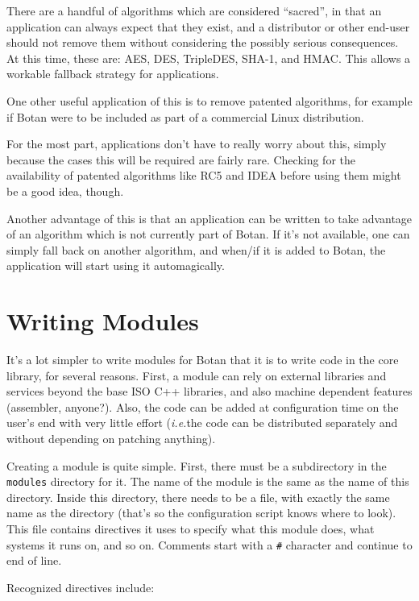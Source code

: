 \documentclass{article}
\newcommand{\filename}[1]{\texttt{#1}}
\newcommand{\ie}[0]{\emph{i.e.}}
\begin{document}
There are a handful of algorithms which are considered ``sacred'', in that an
application can always expect that they exist, and a distributor or other
end-user should not remove them without considering the possibly serious
consequences. At this time, these are: AES, DES, TripleDES, SHA-1, and HMAC.
This allows a workable fallback strategy for applications.

One other useful application of this is to remove patented algorithms, for
example if Botan were to be included as part of a commercial Linux
distribution.

For the most part, applications don't have to really worry about this, simply
because the cases this will be required are fairly rare. Checking for the
availability of patented algorithms like RC5 and IDEA before using them might
be a good idea, though.

Another advantage of this is that an application can be written to take
advantage of an algorithm which is not currently part of Botan. If it's not
available, one can simply fall back on another algorithm, and when/if it is
added to Botan, the application will start using it automagically.

\pagebreak

\section{Writing Modules}

It's a lot simpler to write modules for Botan that it is to write code in the
core library, for several reasons. First, a module can rely on external
libraries and services beyond the base ISO C++ libraries, and also machine
dependent features (assembler, anyone?). Also, the code can be added at
configuration time on the user's end with very little effort (\ie the code can
be distributed separately and without depending on patching anything).

Creating a module is quite simple. First, there must be a subdirectory in the
\filename{modules} directory for it. The name of the module is the same as the
name of this directory. Inside this directory, there needs to be a file, with
exactly the same name as the directory (that's so the configuration script
knows where to look). This file contains directives it uses to specify what
this module does, what systems it runs on, and so on. Comments start with a
\verb|#| character and continue to end of line.

Recognized directives include:
\end{document}
